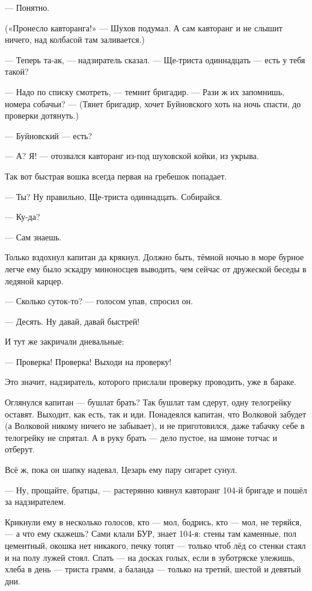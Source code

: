 --- Понятно.

(«Пронесло кавторанга!» --- Шухов подумал. А сам кавторанг и не слышит ничего, над колбасой там
заливается.)

--- Теперь та-ак, --- надзиратель сказал. --- Ще-триста одиннадцать --- есть у тебя такой?

--- Надо по списку смотреть, --- темнит бригадир. --- Рази ж их запомнишь, номера собачьи? --- (Тянет
бригадир, хочет Буйновского хоть на ночь спасти, до проверки дотянуть.)

--- Буйновский --- есть?

--- А? Я! --- отозвался кавторанг из-под шуховской койки, из укрыва.

Так вот быстрая вошка всегда первая на гребешок попадает.

--- Ты? Ну правильно, Ще-триста одиннадцать. Собирайся.

--- Ку-да?

--- Сам знаешь.

Только вздохнул капитан да крякнул. Должно быть, тёмной ночью в море бурное легче ему было
эскадру миноносцев выводить, чем сейчас от дружеской беседы в ледяной карцер.

--- Сколько суток-то? --- голосом упав, спросил он.

--- Десять. Ну давай, давай быстрей!

И тут же закричали дневальные:

--- Проверка! Проверка! Выходи на проверку!

Это значит, надзиратель, которого прислали проверку проводить, уже в бараке.

Оглянулся капитан --- бушлат брать? Так бушлат там сдерут, одну телогрейку оставят. Выходит,
как есть, так и иди. Понадеялся капитан, что Волковой забудет (а Волковой никому ничего не
забывает), и не приготовился, даже табачку себе в телогрейку не спрятал. А в руку брать --- дело
пустое, на шмоне тотчас и отберут.

Всё ж, пока он шапку надевал, Цезарь ему пару сигарет сунул.

--- Ну, прощайте, братцы, --- растерянно кивнул кавторанг 104-й бригаде и пошёл за надзирателем.

Крикнули ему в несколько голосов, кто --- мол, бодрись, кто --- мол, не теряйся, --- а что ему
скажешь? Сами клали БУР, знает 104-я: стены там каменные, пол цементный, окошка нет никакого,
печку топят --- только чтоб лёд со стенки стаял и на полу лужей стоял. Спать --- на досках голых,
если в зуботряске улежишь, хлеба в день --- триста грамм, а баланда --- только на третий, шестой
и девятый дни.

